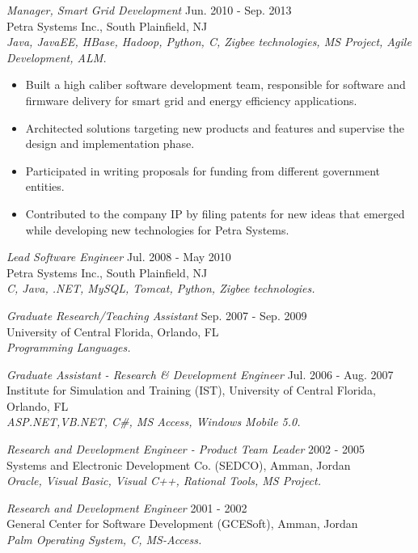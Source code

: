 \documentclass[line,margin]{res}
\begin{document}
\begin{resume}
{\sl Manager, Smart Grid Development} \hfill        Jun. 2010 - Sep. 2013  \\
Petra Systems Inc., South Plainfield, NJ \\
  \textit{Java, JavaEE, HBase, Hadoop, Python, C, Zigbee technologies, MS
  Project, Agile Development, ALM.}
  \begin{itemize} \itemsep -2pt %
      \item  Built a high caliber software development team, responsible for
      software and firmware delivery for smart grid and energy
      efficiency applications.
      \item  Architected solutions targeting new products and features and
      supervise the design and implementation phase.
      \item  Participated in writing proposals for funding from different
      government entities.
      \item  Contributed to the company IP by filing patents for new ideas that
      emerged while developing new technologies for Petra Systems.
 \end{itemize}

{\sl Lead Software Engineer} \hfill        Jul. 2008 - May 2010  \\
Petra Systems Inc., South Plainfield, NJ \\
\textit{C, Java, .NET, MySQL, Tomcat, Python, Zigbee technologies.}

{\sl Graduate Research/Teaching Assistant} \hfill   Sep. 2007 - Sep. 2009 \\
University of Central Florida, Orlando, FL \\
\textit{Programming Languages.}

{\sl Graduate Assistant - Research \& Development Engineer} \hfill    Jul. 2006
- Aug. 2007 \\
Institute for Simulation and Training (IST), University of Central Florida,
Orlando, FL \\
\textit{ASP.NET,VB.NET, C\#, MS Access, Windows Mobile 5.0.}

{\sl Research and Development Engineer - Product Team Leader} \hfill   2002 -
2005 \\
Systems and Electronic Development Co. (SEDCO), Amman, Jordan \\
\textit{Oracle, Visual Basic, Visual C++, Rational Tools, MS Project.}

{\sl Research and Development Engineer} \hfill   2001 - 2002 \\
General Center for Software Development (GCESoft), Amman, Jordan \\
\textit{Palm Operating System, C, MS-Access.}


\end{resume}
\end{document}
